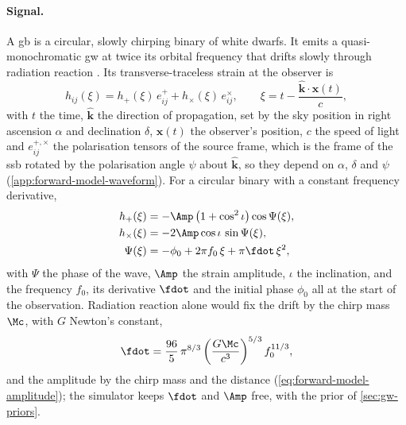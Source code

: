 \paragraph{Signal.}
A \ac{gb} is a circular, slowly chirping binary of white dwarfs. It emits a quasi-monochromatic \ac{gw}
at twice its orbital frequency that drifts slowly through radiation reaction
\citep{nelemans2001gravitational,korol2017prospects}. Its transverse-traceless strain at the
observer is
\begin{equation}
  h_{ij}(\xi) = h_+(\xi)\,e^+_{ij} + h_\times(\xi)\,e^\times_{ij},\qquad
  \xi = t - \frac{\hat{\mathbf k}\cdot\mathbf x(t)}{c},
  \label{eq:forward-model-xi}
\end{equation}
with $t$ the time, $\hat{\mathbf k}$ the direction of propagation, set by the sky position in
right ascension $\alpha$ and declination $\delta$, $\mathbf x(t)$ the observer's position, $c$ the
speed of light and $e^{+,\times}_{ij}$ the polarisation tensors of the source frame, which is the
frame of the \ac{ssb} rotated by the polarisation angle $\psi$ about $\hat{\mathbf k}$, so they depend
on $\alpha$, $\delta$ and $\psi$ (\cref{app:forward-model-waveform}). For a circular binary with a constant
frequency derivative,
\begin{equation}
\begin{aligned}
  h_+(\xi) &= -\Amp\,\bigl(1+\cos^2\iota\bigr)\cos\Psi(\xi),\\
  h_\times(\xi) &= -2\Amp\cos\iota\,\sin\Psi(\xi),\\
  \Psi(\xi) &= -\phi_0 + 2\pi f_0\,\xi + \pi\fdot\,\xi^2,
\end{aligned}
  \label{eq:forward-model-waveform}
\end{equation}
with $\Psi$ the phase of the wave, $\Amp$ the strain amplitude, $\iota$ the inclination, and the
frequency $f_0$, its derivative $\fdot$ and the initial phase $\phi_0$ all at the start of the
observation.
Radiation reaction alone would fix the drift by the chirp mass $\Mc$, with $G$ Newton's constant,
\begin{equation}
  \fdot = \frac{96}{5}\,\pi^{8/3}\left(\frac{G\Mc}{c^3}\right)^{5/3} f_0^{11/3},
  \label{eq:forward-model-fdot}
\end{equation}
and the amplitude by the chirp mass and the distance (\cref{eq:forward-model-amplitude}); the
simulator keeps $\fdot$ and $\Amp$ free, with the prior of \cref{sec:gw-priors}.

